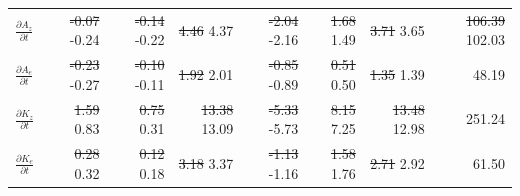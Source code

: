\documentclass[pdflatex,sn-chicago]{sn-jnl}%
\makeatletter
\theoremstyle{plain}
\theoremstyle{definition}
\theoremstyle{remark}
\theoremstyle{definition}
\providecommand{\DIFaddtex}[1]{{\protect\color{blue}#1}} %
\providecommand{\DIFdeltex}[1]{{\protect\color{red}\sout{#1}}} %
\providecommand{\DIFaddFL}[1]{\DIFadd{#1}} %
\providecommand{\DIFdelFL}[1]{\DIFdel{#1}} %
\providecommand{\DIFaddbeginFL}{} %
\providecommand{\DIFaddendFL}{} %
\providecommand{\DIFdelbeginFL}{} %
\providecommand{\DIFdelendFL}{} %
\providecommand{\DIFadd}[1]{\texorpdfstring{\DIFaddtex{#1}}{#1}} %
\providecommand{\DIFdel}[1]{\texorpdfstring{\DIFdeltex{#1}}{}} %
\let\sout@orig\sout %
\renewcommand{\sout}[1]{\ifmmode\text{\sout@orig{\ensuremath{#1}}}\else\sout@orig{#1}\fi} %
\makeatother
\begin{document}
\begin{table}[!htbp]
\begin{tabular}{lrrrrrrr}
$\frac{\partial A_z}{\partial t}$ & \DIFdelbeginFL \DIFdelFL{-0.07 }\DIFdelendFL \DIFaddbeginFL \DIFaddFL{-0.24 }\DIFaddendFL & \DIFdelbeginFL \DIFdelFL{-0.14 }\DIFdelendFL \DIFaddbeginFL \DIFaddFL{-0.22 }\DIFaddendFL & \DIFdelbeginFL \DIFdelFL{4.46 }\DIFdelendFL \DIFaddbeginFL \DIFaddFL{4.37 }\DIFaddendFL & \DIFdelbeginFL \DIFdelFL{-2.04 }\DIFdelendFL \DIFaddbeginFL \DIFaddFL{-2.16 }\DIFaddendFL & \DIFdelbeginFL \DIFdelFL{1.68 }\DIFdelendFL \DIFaddbeginFL \DIFaddFL{1.49 }\DIFaddendFL & \DIFdelbeginFL \DIFdelFL{3.71 }\DIFdelendFL \DIFaddbeginFL \DIFaddFL{3.65 }\DIFaddendFL & \DIFdelbeginFL \DIFdelFL{106.39 }\DIFdelendFL \DIFaddbeginFL \DIFaddFL{102.03 }\DIFaddendFL \\
$\frac{\partial A_e}{\partial t}$ & \DIFdelbeginFL \DIFdelFL{-0.23 }\DIFdelendFL \DIFaddbeginFL \DIFaddFL{-0.27 }\DIFaddendFL & \DIFdelbeginFL \DIFdelFL{-0.10 }\DIFdelendFL \DIFaddbeginFL \DIFaddFL{-0.11 }\DIFaddendFL & \DIFdelbeginFL \DIFdelFL{1.92 }\DIFdelendFL \DIFaddbeginFL \DIFaddFL{2.01 }\DIFaddendFL & \DIFdelbeginFL \DIFdelFL{-0.85 }\DIFdelendFL \DIFaddbeginFL \DIFaddFL{-0.89 }\DIFaddendFL & \DIFdelbeginFL \DIFdelFL{0.51 }\DIFdelendFL \DIFaddbeginFL \DIFaddFL{0.50 }\DIFaddendFL & \DIFdelbeginFL \DIFdelFL{1.35 }\DIFdelendFL \DIFaddbeginFL \DIFaddFL{1.39 }\DIFaddendFL & 48.19 \\
$\frac{\partial K_z}{\partial t}$ & \DIFdelbeginFL \DIFdelFL{1.59 }\DIFdelendFL \DIFaddbeginFL \DIFaddFL{0.83 }\DIFaddendFL & \DIFdelbeginFL \DIFdelFL{0.75 }\DIFdelendFL \DIFaddbeginFL \DIFaddFL{0.31 }\DIFaddendFL & \DIFdelbeginFL \DIFdelFL{13.38 }\DIFdelendFL \DIFaddbeginFL \DIFaddFL{13.09 }\DIFaddendFL & \DIFdelbeginFL \DIFdelFL{-5.33 }\DIFdelendFL \DIFaddbeginFL \DIFaddFL{-5.73 }\DIFaddendFL & \DIFdelbeginFL \DIFdelFL{8.15 }\DIFdelendFL \DIFaddbeginFL \DIFaddFL{7.25 }\DIFaddendFL & \DIFdelbeginFL \DIFdelFL{13.48 }\DIFdelendFL \DIFaddbeginFL \DIFaddFL{12.98 }\DIFaddendFL & 251.24 \\
$\frac{\partial K_e}{\partial t}$ & \DIFdelbeginFL \DIFdelFL{0.28 }\DIFdelendFL \DIFaddbeginFL \DIFaddFL{0.32 }\DIFaddendFL & \DIFdelbeginFL \DIFdelFL{0.12 }\DIFdelendFL \DIFaddbeginFL \DIFaddFL{0.18 }\DIFaddendFL & \DIFdelbeginFL \DIFdelFL{3.18 }\DIFdelendFL \DIFaddbeginFL \DIFaddFL{3.37 }\DIFaddendFL & \DIFdelbeginFL \DIFdelFL{-1.13 }\DIFdelendFL \DIFaddbeginFL \DIFaddFL{-1.16 }\DIFaddendFL & \DIFdelbeginFL \DIFdelFL{1.58 }\DIFdelendFL \DIFaddbeginFL \DIFaddFL{1.76 }\DIFaddendFL & \DIFdelbeginFL \DIFdelFL{2.71 }\DIFdelendFL \DIFaddbeginFL \DIFaddFL{2.92 }\DIFaddendFL & 61.50 \\

\end{tabular}
\end{table}
\end{document}
